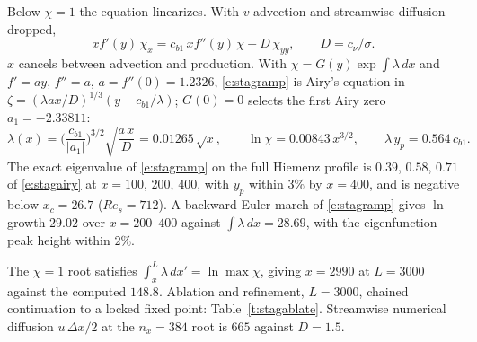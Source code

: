 \documentclass[10pt]{article}
\begin{document}
Below $\chi=1$ the equation linearizes. With $v$-advection and streamwise
diffusion dropped,
\begin{equation}
  x f'(y)\,\chi_x = c_{b1}\,x f''(y)\,\chi + D\,\chi_{yy},
  \qquad D=c_\nu/\sigma .
  \label{e:stagramp}
\end{equation}
$x$ cancels between advection and production. With
$\chi=G(y)\exp\!\int\!\lambda\,dx$ and $f'=ay$, $f''=a$,
$a=f''(0)=1.2326$, \eqref{e:stagramp} is Airy's equation in
$\zeta=(\lambda a x/D)^{1/3}(y-c_{b1}/\lambda)$; $G(0)=0$ selects the first
Airy zero $a_1=-2.33811$:
\begin{equation}
  \lambda(x)=\Big(\frac{c_{b1}}{|a_1|}\Big)^{3/2}\sqrt{\frac{a\,x}{D}}
  =0.01265\,\sqrt{x},
  \qquad
  \ln\chi=0.00843\,x^{3/2},
  \qquad
  \lambda\,y_p=0.564\,c_{b1}.
  \label{e:stagairy}
\end{equation}
The exact eigenvalue of \eqref{e:stagramp} on the full Hiemenz profile is
$0.39$, $0.58$, $0.71$ of \eqref{e:stagairy} at $x=100$, $200$, $400$, with
$y_p$ within $3\%$ by $x=400$, and is negative below $x_c=26.7$
($Re_s=712$). A backward-Euler march of \eqref{e:stagramp} gives $\ln$ growth
$29.02$ over $x=200$--$400$ against $\int\!\lambda\,dx=28.69$, with the
eigenfunction peak height within $2\%$.

The $\chi=1$ root satisfies $\int_x^L\!\lambda\,dx'=\ln\max\chi$, giving
$x=2990$ at $L=3000$ against the computed $148.8$. Ablation and refinement,
$L=3000$, chained continuation to a locked fixed point:
Table~\ref{t:stagablate}. Streamwise numerical diffusion $u\,\Delta x/2$ at
the $n_x=384$ root is $665$ against $D=1.5$.
\end{document}
